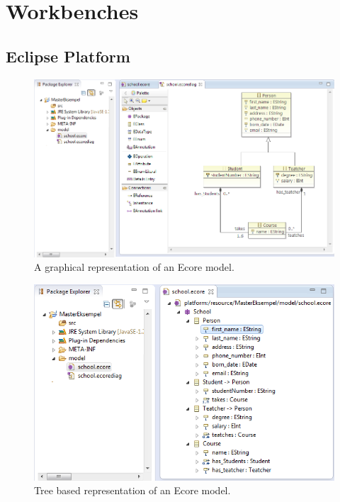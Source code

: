 \section{Workbenches}

\subsection{Eclipse Platform}

\begin{figure}[H]
	\centering
	\includegraphics[scale=0.6]{./Figures/EMF_Diagram_Picture.png}
	\caption[Ecore model represented by Ecore Tools]
	{A graphical representation of an Ecore model.}
	\label{fig:EMF_Diagram}
\end{figure}

\begin{figure}[H]
	\centering
	\includegraphics[scale=0.8]{./Figures/EMF_Ecore_Picture.png}
	\caption[Tree based representation of an Ecore model]
	{Tree based representation of an Ecore model.}
	\label{fig:EMF_Ecore}
\end{figure}

